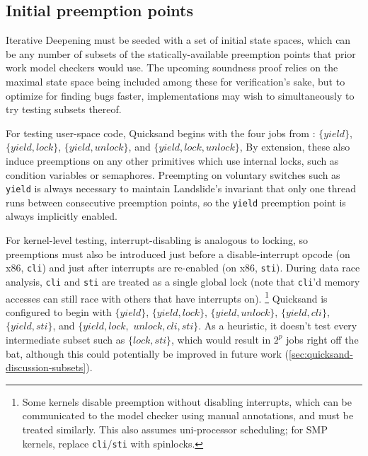 
\subsection{Initial preemption points}
\label{sec:quicksand-initial-pps}

Iterative Deepening must be seeded with a set of initial state spaces,
which can be any number of subsets of the statically-available preemption points
that prior work model checkers would use.
The upcoming soundness proof relies on the maximal state space being included among these for verification's sake,
but to optimize for finding bugs faster,
implementations may wish to simultaneously to try testing subsets thereof.

For testing user-space code, Quicksand begins with the four jobs from :
$\{yield\}$,
$\{yield,lock\}$,
$\{yield,unlock\}$,
and $\{yield,lock,unlock\}$,
By extension, these also induce preemptions on any other primitives
which use
internal locks,
such as condition variables or semaphores.
Preempting on voluntary switches such as {\tt yield} is always necessary to maintain
Landslide's invariant that only one thread runs between consecutive preemption points,
so the {\tt yield} preemption point is always implicitly enabled.

For kernel-level testing, interrupt-disabling is analogous to locking,
so preemptions must also be introduced
just before a disable-interrupt opcode (on x86, {\tt cli})
and just after interrupts are re-enabled (on x86, {\tt sti}).
During data race analysis, {\tt cli} and {\tt sti} are treated as a single global lock
(note that {\tt cli}'d memory accesses can still race with others that have interrupts on).%
\footnote{Some kernels disable preemption without disabling interrupts,
which can be communicated to the model checker using manual annotations,
and must be treated similarly.
This also assumes uni-processor scheduling; for SMP kernels, replace {\tt cli}/{\tt sti} with spinlocks.}
Quicksand is configured to begin with
$\{yield\}$,
$\{yield,lock\}$,
$\{yield,unlock\}$,
$\{yield,cli\}$,
$\{yield,sti\}$,
and $\{yield,lock,$ $unlock,cli,sti\}$.
As a heuristic, it doesn't test every intermediate subset such as $\{lock,sti\}$,
which would result in $2^p$ jobs right off the bat,
although this could potentially be improved in future work (\cref{sec:quicksand-discussion-subsets}).


